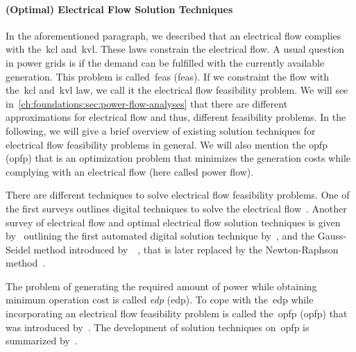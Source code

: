 \paragraph{(Optimal) Electrical Flow Solution Techniques} 
% 
In the aforementioned paragraph, we described that an electrical flow complies
with the~\gls{kcl} and~\gls{kvl}. These laws constrain the electrical flow. A
usual question in power grids is if the demand can be fulfilled with the
currently available generation. This problem is called~\acrlong{feas}
(\gls{feas}). If we constraint the flow with the~\gls{kcl} and~\gls{kvl} law, we
call it the electrical flow feasibility problem. We will see
in~\cref{ch:foundations:sec:power-flow-analyses} that there are different
approximations for electrical flow and thus, different feasibility problems. In
the following, we will give a brief overview of existing solution techniques for
electrical flow feasibility problems in general. We will also mention the
\acrlong{opfp} (\gls{opfp}) that is an optimization problem that minimizes the
generation costs while complying with an electrical flow (here called power
flow).

There are different techniques to solve electrical flow feasibility problems.
One of the first surveys outlines digital techniques to solve the electrical
flow~\parencite{Sas67}. Another survey of electrical flow and optimal electrical
flow solution techniques is given by~\textcite{Huneault1991} outlining the first
automated digital solution technique by~\textcite{War56}, and the Gauss-Seidel
method introduced by~\citeauthor{Car62}~\parencite{Car62,Car79}, that is later
replaced by the Newton-Raphson method~\parencite{Pes68,Cos99}.
% 

The problem of generating the required amount of power while obtaining minimum
operation cost is called \emph{\acrlong{edp}} (\gls{edp}).
% 
% 
To cope with the~\gls{edp} while incorporating an electrical flow feasibility
problem is called the~\acrlong{opfp} (\gls{opfp}) that was introduced
by~\textcite{Car62}. The development of solution techniques on~\gls{opfp} is
summarized by~\textcite{SurveyOPF1,SurveyOPF2}.

